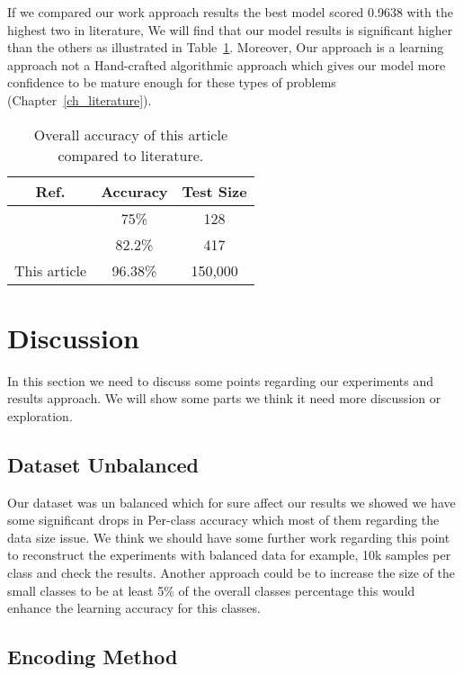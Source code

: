 If we compared our work approach results the best model scored 0.9638 with the highest two in literature, We will find that our model results is significant higher than the others as illustrated in Table~\ref{tab:summ-results}. Moreover, Our approach is a learning approach not a Hand-crafted algorithmic approach which gives our model more confidence to be mature enough for these types of problems (Chapter~\ref{ch_literature}).

\begin{table}[!tb]
  \centering
  \begin{tabular}{c c c}
    \toprule
    \textbf{Ref.}& \textbf{Accuracy}& \textbf{Test Size} \\
    \midrule
    \cite{Alnagdawi2013FindingArabicPoemMeter}   & 75\%     & 128\\
    \cite{Abuata2016RuleBasedAlgorithmFor}      & 82.2\%   & 417  \\
    This article   & 96.38\%  & 150,000 \\
    \bottomrule
  \end{tabular}
  \caption{Overall accuracy of this article compared to literature.}\label{tab:summ-results}
\end{table}



\section{Discussion}\label{sec_discussion}

In this section we need to discuss some points regarding our experiments and results approach. We will show some parts we think it need more discussion or exploration.


\subsection{Dataset Unbalanced}

Our dataset was un balanced which for sure affect our results we showed we have some significant drops in Per-class accuracy which most of them regarding the data size issue. We think we should have some further work regarding this point to reconstruct the experiments with balanced data for example, 10k samples per class and check the results. Another approach could be to increase the size of the small classes to be at least 5\% of the overall classes percentage this would enhance the learning accuracy for this classes.
  
\subsection{Encoding Method}

